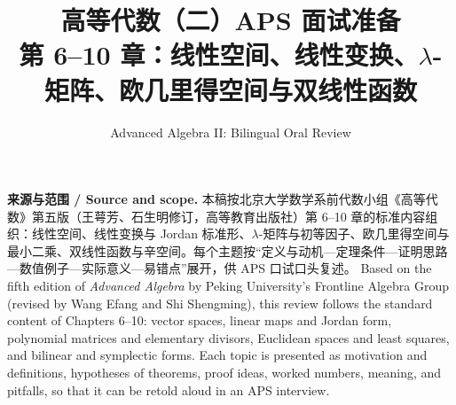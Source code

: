 \documentclass[UTF8,11pt,a4paper]{ctexart}
\title{高等代数（二）APS 面试准备\\[4pt]\large 第 6--10 章：线性空间、线性变换、$\lambda$-矩阵、欧几里得空间与双线性函数}
\author{Advanced Algebra II: Bilingual Oral Review}
\date{}
\begin{document}
\maketitle

{\footnotesize\noindent\textbf{来源与范围 / Source and scope.} 本稿按北京大学数学系前代数小组《高等代数》第五版（王萼芳、石生明修订，高等教育出版社）第 6--10 章的标准内容组织：线性空间、线性变换与 Jordan 标准形、$\lambda$-矩阵与初等因子、欧几里得空间与最小二乘、双线性函数与辛空间。每个主题按“定义与动机—定理条件—证明思路—数值例子—实际意义—易错点”展开，供 APS 口试口头复述。 Based on the fifth edition of \emph{Advanced Algebra} by Peking University's Frontline Algebra Group (revised by Wang Efang and Shi Shengming), this review follows the standard content of Chapters 6--10: vector spaces, linear maps and Jordan form, polynomial matrices and elementary divisors, Euclidean spaces and least squares, and bilinear and symplectic forms. Each topic is presented as motivation and definitions, hypotheses of theorems, proof ideas, worked numbers, meaning, and pitfalls, so that it can be retold aloud in an APS interview.\par}
\end{document}
